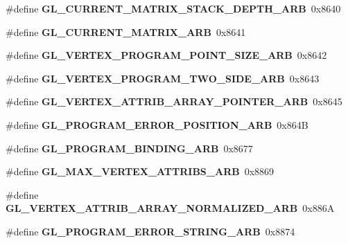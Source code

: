 \begin{DoxyCompactItemize}
\item 
\#define {\bfseries G\+L\+\_\+\+C\+U\+R\+R\+E\+N\+T\+\_\+\+M\+A\+T\+R\+I\+X\+\_\+\+S\+T\+A\+C\+K\+\_\+\+D\+E\+P\+T\+H\+\_\+\+A\+R\+B}~0x8640\label{_s_d_l__opengl_8h_afe1cca8a77b823984170337b474d7d71}

\item 
\#define {\bfseries G\+L\+\_\+\+C\+U\+R\+R\+E\+N\+T\+\_\+\+M\+A\+T\+R\+I\+X\+\_\+\+A\+R\+B}~0x8641\label{_s_d_l__opengl_8h_a156dd80da92183d7b6a6f63f0edb29ea}

\item 
\#define {\bfseries G\+L\+\_\+\+V\+E\+R\+T\+E\+X\+\_\+\+P\+R\+O\+G\+R\+A\+M\+\_\+\+P\+O\+I\+N\+T\+\_\+\+S\+I\+Z\+E\+\_\+\+A\+R\+B}~0x8642\label{_s_d_l__opengl_8h_a5fd52c78c1e61a1ce4c6fe90020aaf23}

\item 
\#define {\bfseries G\+L\+\_\+\+V\+E\+R\+T\+E\+X\+\_\+\+P\+R\+O\+G\+R\+A\+M\+\_\+\+T\+W\+O\+\_\+\+S\+I\+D\+E\+\_\+\+A\+R\+B}~0x8643\label{_s_d_l__opengl_8h_ac046a6df3c13fa20a1eb19cf323b7a4e}

\item 
\#define {\bfseries G\+L\+\_\+\+V\+E\+R\+T\+E\+X\+\_\+\+A\+T\+T\+R\+I\+B\+\_\+\+A\+R\+R\+A\+Y\+\_\+\+P\+O\+I\+N\+T\+E\+R\+\_\+\+A\+R\+B}~0x8645\label{_s_d_l__opengl_8h_a5c10502ad1c7519986f795a7dcef0db8}

\item 
\#define {\bfseries G\+L\+\_\+\+P\+R\+O\+G\+R\+A\+M\+\_\+\+E\+R\+R\+O\+R\+\_\+\+P\+O\+S\+I\+T\+I\+O\+N\+\_\+\+A\+R\+B}~0x864\+B\label{_s_d_l__opengl_8h_a1c6a1bc963e289308bdc6cfc56045694}

\item 
\#define {\bfseries G\+L\+\_\+\+P\+R\+O\+G\+R\+A\+M\+\_\+\+B\+I\+N\+D\+I\+N\+G\+\_\+\+A\+R\+B}~0x8677\label{_s_d_l__opengl_8h_a7f1005bf576a00f8157e3d4cbcb84cf1}

\item 
\#define {\bfseries G\+L\+\_\+\+M\+A\+X\+\_\+\+V\+E\+R\+T\+E\+X\+\_\+\+A\+T\+T\+R\+I\+B\+S\+\_\+\+A\+R\+B}~0x8869\label{_s_d_l__opengl_8h_a7642f207f5b952cce8859efa6ad03a81}

\item 
\#define {\bfseries G\+L\+\_\+\+V\+E\+R\+T\+E\+X\+\_\+\+A\+T\+T\+R\+I\+B\+\_\+\+A\+R\+R\+A\+Y\+\_\+\+N\+O\+R\+M\+A\+L\+I\+Z\+E\+D\+\_\+\+A\+R\+B}~0x886\+A\label{_s_d_l__opengl_8h_ac3e2ea329d1a48983a1c79865cbf844b}

\item 
\#define {\bfseries G\+L\+\_\+\+P\+R\+O\+G\+R\+A\+M\+\_\+\+E\+R\+R\+O\+R\+\_\+\+S\+T\+R\+I\+N\+G\+\_\+\+A\+R\+B}~0x8874\label{_s_d_l__opengl_8h_a3719377662041961e1f8e8798d35c0f5}


\end{DoxyCompactItemize}
